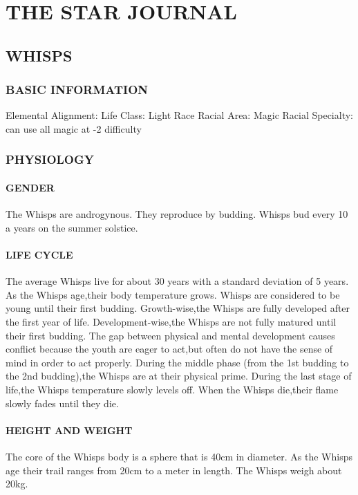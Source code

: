 \chapter{THE STAR JOURNAL}
\section{WHISPS}
\subsection{BASIC INFORMATION}
Elemental Alignment: Life
Class: Light Race
Racial Area: Magic
Racial Specialty: can use all magic at -2 difficulty
\subsection{PHYSIOLOGY}
\subsubsection{GENDER}
The Whisps are androgynous.  They reproduce by budding.  Whisps bud every 10 a years on the summer solstice.
\subsubsection{LIFE CYCLE}
The average Whisps live for about 30 years with a standard deviation of 5 years.  As the Whisps age,their body temperature grows.  Whisps are considered to be young until their first budding.  Growth-wise,the Whisps are fully developed after the first year of life.  Development-wise,the Whisps are not fully matured until their first budding.  The gap between physical and mental development causes conflict because the youth are eager to act,but often do not have the sense of mind in order to act properly.  During the middle phase (from the 1st budding to the 2nd budding),the Whisps are at their physical prime.  During the last stage of life,the Whisps temperature slowly levels off.  When the Whisps die,their flame slowly fades until they die.
\subsubsection{HEIGHT AND WEIGHT}
The core of the Whisps body is a sphere that is 40cm in diameter.  As the Whisps age their trail ranges from 20cm to a meter in length.  The Whisps weigh about 20kg.
